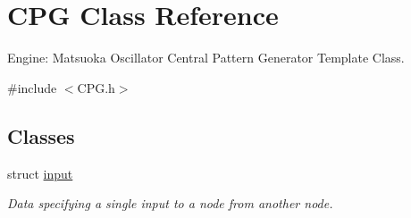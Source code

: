 \hypertarget{classCPG}{}\section{C\+PG Class Reference}
\label{classCPG}


Engine\+: Matsuoka Oscillator Central Pattern Generator Template Class.  




{\ttfamily \#include $<$C\+P\+G.\+h$>$}

\subsection*{Classes}
\begin{DoxyCompactItemize}
\item 
struct \mbox{\hyperlink{structCPG_1_1input}{input}}
\begin{DoxyCompactList}\small\item\em Data specifying a single input to a node from another node. \end{DoxyCompactList}\end{DoxyCompactItemize}
